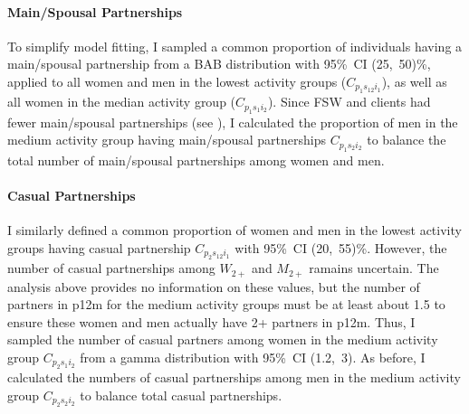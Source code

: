 \paragraph{Main/Spousal Partnerships}
To simplify model fitting, I sampled a common proportion of
individuals having a main/spousal partnership from a BAB distribution with 95\%~CI (25,~50)\%,
applied to all women and men in the lowest activity groups ($C_{p_{1}s_{12}i_{1}}$),
as well as all women in the median activity group ($C_{p_{1}s_{1}i_{2}}$).
Since FSW and clients had fewer main/spousal partnerships (see ),
I calculated the proportion of men in the medium activity group having main/spousal partnerships
$C_{p_{1}s_{2}i_{2}}$ to balance the total number of main/spousal partnerships among women and men.
\paragraph{Casual Partnerships}
I similarly defined a common proportion of women and men in the lowest activity groups
having casual partnership $C_{p_{2}s_{12}i_{1}}$ with 95\%~CI (20,~55)\%.
However, the number of casual partnerships among $W_{2+}$ and $M_{2+}$ ramains uncertain.
The analysis above provides no information on these values,
but the number of partners in p12m for the medium activity groups must be at least about 1.5
to ensure these women and men actually have 2+ partners in p12m.
Thus, I sampled the number of casual partners among women in the medium activity group
$C_{p_{2}s_{1}i_{2}}$ from a gamma distribution with 95\%~CI (1.2,~3).
As before, I calculated the numbers of casual partnerships among men in the medium activity group
$C_{p_{2}s_{2}i_{2}}$ to balance total casual partnerships.
